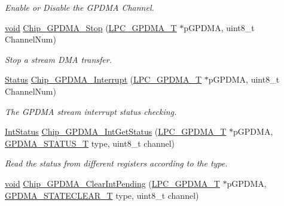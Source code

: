 \begin{DoxyCompactItemize}
\begin{DoxyCompactList}\small\item\em Enable or Disable the G\-P\-D\-M\-A Channel. \end{DoxyCompactList}\item 
\hyperlink{Paradigm_2Tern__EE_2small_2portmacro_8h_a14d32f8130d3c0b212cfc751730b5b49}{void} \hyperlink{group__GPDMA__17XX__40XX_gafa887387f85205ecacc3220700b49d0d}{Chip\-\_\-\-G\-P\-D\-M\-A\-\_\-\-Stop} (\hyperlink{structLPC__GPDMA__T}{L\-P\-C\-\_\-\-G\-P\-D\-M\-A\-\_\-\-T} $\ast$p\-G\-P\-D\-M\-A, uint8\-\_\-t Channel\-Num)
\begin{DoxyCompactList}\small\item\em Stop a stream D\-M\-A transfer. \end{DoxyCompactList}\item 
\hyperlink{group__LPC__Types__Public__Types_ga67a0db04d321a74b7e7fcfd3f1a3f70b}{Status} \hyperlink{group__GPDMA__17XX__40XX_ga986bb4a0d10a05ff6284fff871fb86c6}{Chip\-\_\-\-G\-P\-D\-M\-A\-\_\-\-Interrupt} (\hyperlink{structLPC__GPDMA__T}{L\-P\-C\-\_\-\-G\-P\-D\-M\-A\-\_\-\-T} $\ast$p\-G\-P\-D\-M\-A, uint8\-\_\-t Channel\-Num)
\begin{DoxyCompactList}\small\item\em The G\-P\-D\-M\-A stream interrupt status checking. \end{DoxyCompactList}\item 
\hyperlink{group__LPC__Types__Public__Types_gab7d263072f745b4f3913fb0afc434c4e}{Int\-Status} \hyperlink{group__GPDMA__17XX__40XX_ga06fdae68a49436b9a02d42ad85782ff4}{Chip\-\_\-\-G\-P\-D\-M\-A\-\_\-\-Int\-Get\-Status} (\hyperlink{structLPC__GPDMA__T}{L\-P\-C\-\_\-\-G\-P\-D\-M\-A\-\_\-\-T} $\ast$p\-G\-P\-D\-M\-A, \hyperlink{group__GPDMA__17XX__40XX_ga2f4aa97bd0ffa5046c8e2b17028d99cc}{G\-P\-D\-M\-A\-\_\-\-S\-T\-A\-T\-U\-S\-\_\-\-T} type, uint8\-\_\-t channel)
\begin{DoxyCompactList}\small\item\em Read the status from different registers according to the type. \end{DoxyCompactList}\item 
\hyperlink{Paradigm_2Tern__EE_2small_2portmacro_8h_a14d32f8130d3c0b212cfc751730b5b49}{void} \hyperlink{group__GPDMA__17XX__40XX_ga94c9bdb806ce700f0c04deeec0da142e}{Chip\-\_\-\-G\-P\-D\-M\-A\-\_\-\-Clear\-Int\-Pending} (\hyperlink{structLPC__GPDMA__T}{L\-P\-C\-\_\-\-G\-P\-D\-M\-A\-\_\-\-T} $\ast$p\-G\-P\-D\-M\-A, \hyperlink{group__GPDMA__17XX__40XX_gabbb281ef4b818f2e60167cf766f94fdb}{G\-P\-D\-M\-A\-\_\-\-S\-T\-A\-T\-E\-C\-L\-E\-A\-R\-\_\-\-T} type, uint8\-\_\-t channel)

\end{DoxyCompactItemize}
